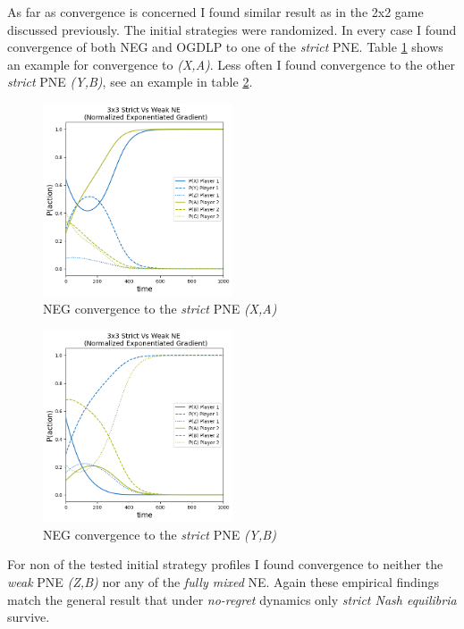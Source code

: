 As far as convergence is concerned I found similar result as in the 2x2 game discussed previously. The initial strategies were randomized. In every case I found convergence of both NEG and OGDLP to one of the \textit{strict} PNE. Table \ref{fig:Weak3x3-1} shows an example for convergence to \textit{(X,A)}. Less often I found convergence to the other \textit{strict} PNE \textit{(Y,B)}, see an example in table \ref{fig:Weak3x3-2}. 

\begin{figure}[H]
    \centering
    \includegraphics[width=0.5\textwidth]{logos/Weak3x3-1.png}
    \caption{NEG convergence to the \textit{strict }PNE \textit{(X,A)}}
    \label{fig:Weak3x3-1}
\end{figure}

\begin{figure}[H]
    \centering
    \includegraphics[width=0.5\textwidth]{logos/Weak3x3-2.png}
    \caption{NEG convergence to the \textit{strict }PNE \textit{(Y,B)}}
    \label{fig:Weak3x3-2}
\end{figure}

For non of the tested initial strategy profiles I found convergence to neither the \textit{weak} PNE \textit{(Z,B)} nor any of the \textit{fully mixed} NE. Again these empirical findings match the general result that under \textit{no-regret} dynamics only \textit{strict Nash equilibria} survive.  

